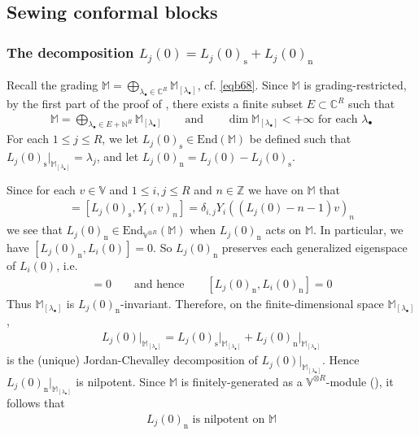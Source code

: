 \documentclass[11pt,b5paper,notitlepage]{article}
\theoremstyle{definition}
\theoremstyle{plain}
\newcommand{\End}{\mathrm{End}} %
\newcommand{\blt}{\bullet}
\newcommand{\Vbb}{\mathbb V}
\newcommand{\Mbb}{\mathbb M}
\newcommand{\Cbb}{\mathbb C}
\newcommand{\Nbb}{\mathbb N}
\newcommand{\Zbb}{\mathbb Z}
\newcommand{\Ljss}{{L_j(0)_\mathrm{s}}}
\newcommand{\Ljni}{{L_j(0)_\mathrm{n}}}
\newcommand{\<}{\left\langle}
\renewcommand{\>}{\right\rangle}
\newcommand{\Lini}{{L_i(0)_\mathrm{n}}}
\newcommand{\Liss}{{L_i(0)_\mathrm{s}}}
\numberwithin{equation}{subsection}
\begin{document}
\subsection{Sewing conformal blocks}


\subsubsection{The decomposition $L_j(0)=\Ljss+\Ljni$}


Recall the grading $\Mbb=\bigoplus_{\lambda_\blt\in\Cbb^R}\Mbb_{[\lambda_\blt]}$, cf. \eqref{eqb68}.   Since $\Mbb$ is grading-restricted, by the first part of the proof of \cite[Thm. A.2.6]{GZ1}, there exists a finite subset $E\subset\Cbb^R$ such that
\begin{gather}\label{eqb72}
\Mbb=\bigoplus_{\lambda_\blt\in E+\Nbb^R}\Mbb_{[\lambda_\blt]}\qquad\text{and}\qquad \dim\Mbb_{[\lambda_\blt]}<+\infty\text{ for each }\lambda_\blt
\end{gather}
For each $1\leq j\leq R$, we let $\Ljss\in\End(\Mbb)$ be defined such that $\Ljss\big|_{\Mbb_{[\lambda_\blt]}}=\lambda_j$, and let $\Ljni=L_j(0)-\Ljss$. 

Since for each $v\in\Vbb$ and $1\leq i,j\leq R$ and $n\in\Zbb$ we have on $\Mbb$ that
\begin{align*}
[L_j(0),Y_i(v)_n]=[\Ljss,Y_i(v)_n]=\delta_{i,j}Y_i((L_j(0)-n-1)v)_n
\end{align*}
we see that $\Ljni\in\End_{\Vbb^{\otimes R}}(\Mbb)$ when $\Ljni$ acts on $\Mbb$. In particular, we have $[\Ljni,L_i(0)]=0$. So $\Ljni$ preserves each generalized eigenspace of $L_i(0)$, i.e.
\begin{align*}
[\Ljni,\Liss]=0\qquad\text{and hence}\qquad[\Ljni,\Lini]=0
\end{align*}
Thus $\Mbb_{[\lambda_\blt]}$ is $\Ljni$-invariant. Therefore, on the finite-dimensional space $\Mbb_{[\lambda_\blt]}$,
\begin{align*}
L_j(0)\big|_{\Mbb_{[\lambda_\blt]}}=\Ljss\big|_{\Mbb_{[\lambda_\blt]}}+\Ljni\big|_{\Mbb_{[\lambda_\blt]}}
\end{align*}
is the (unique) Jordan-Chevalley decomposition of $L_j(0)\big|_{\Mbb_{[\lambda_\blt]}}$. Hence $\Ljni\big|_{\Mbb_{[\lambda_\blt]}}$ is nilpotent. Since $\Mbb$ is finitely-generated as a $\Vbb^{\otimes R}$-module (\cite{Hua-projectivecover}), it follows that
\begin{align}\label{eqb70}
\Ljni\text{ is nilpotent on }\Mbb
\end{align}
\end{document}

